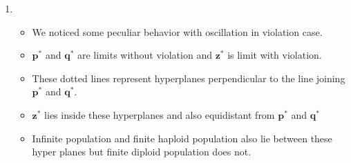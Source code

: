 \documentclass{article}
\begin{document}
\begin{enumerate}
\item
  \begin{itemize}
    \item We noticed some peculiar behavior with oscillation in violation case. 
    
    \item $\bm{p}^\ast$ and $\bm{q}^\ast$ are limits without violation and $\bm{z}^\ast$ is limit with violation.
    
    \item These dotted lines represent hyperplanes perpendicular to the line joining $\bm{p}^\ast$ and $\bm{q}^\ast$. 
    
    \item  $\bm{z}^\ast$ lies inside these hyperplanes and also equidistant from $\bm{p}^\ast$ and $\bm{q}^\ast$
    
    \item  Infinite population and finite haploid population also lie between these hyper planes but finite diploid population does not.
  \end{itemize}
  
% 
%   


\end{enumerate}
\end{document}
